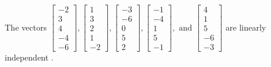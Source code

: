 \begin{exercise}
\begin{exerciseStatement}
  \end{exerciseStatement}
  \begin{exerciseAnswer}
   The vectors \(\left[\begin{array}{r}
-2 \\
3 \\
4 \\
-4 \\
-6
\end{array}\right] , \left[\begin{array}{r}
1 \\
3 \\
2 \\
1 \\
-2
\end{array}\right] , \left[\begin{array}{r}
-3 \\
-6 \\
0 \\
5 \\
2
\end{array}\right] , \left[\begin{array}{r}
-1 \\
-4 \\
1 \\
5 \\
-1
\end{array}\right] , \text{ and } \left[\begin{array}{r}
4 \\
1 \\
5 \\
-6 \\
-3
\end{array}\right]\) are 
  	 linearly independent  .
  


  \end{exerciseAnswer}
\end{exercise}